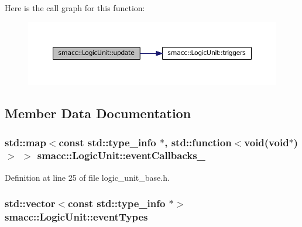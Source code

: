 Here is the call graph for this function\+:
\nopagebreak
\begin{figure}[H]
\begin{center}
\leavevmode
\includegraphics[width=350pt]{classsmacc_1_1LogicUnit_afcec0608a17e039791403472a2411539_cgraph}
\end{center}
\end{figure}




\subsection{Member Data Documentation}
\subsubsection[{\texorpdfstring{event\+Callbacks\+\_\+}{eventCallbacks_}}]{\setlength{\rightskip}{0pt plus 5cm}std\+::map$<$const std\+::type\+\_\+info $\ast$, std\+::function$<$void(void$\ast$)$>$ $>$ smacc\+::\+Logic\+Unit\+::event\+Callbacks\+\_\+}\hypertarget{classsmacc_1_1LogicUnit_ad1b222b3b2bb175d9e8166433e434fab}{}\label{classsmacc_1_1LogicUnit_ad1b222b3b2bb175d9e8166433e434fab}


Definition at line 25 of file logic\+\_\+unit\+\_\+base.\+h.

\subsubsection[{\texorpdfstring{event\+Types}{eventTypes}}]{\setlength{\rightskip}{0pt plus 5cm}std\+::vector$<$const std\+::type\+\_\+info $\ast$$>$ smacc\+::\+Logic\+Unit\+::event\+Types}\hypertarget{classsmacc_1_1LogicUnit_a6f02a49da9b408b54a2755c18c5616a8}{}\label{classsmacc_1_1LogicUnit_a6f02a49da9b408b54a2755c18c5616a8}


